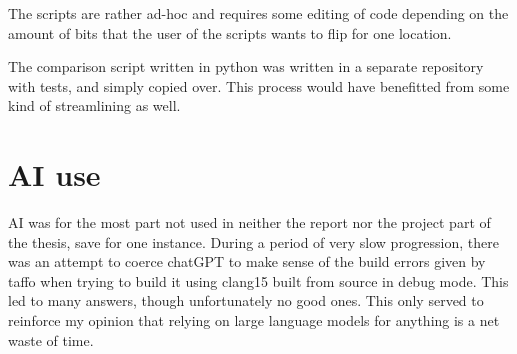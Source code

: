 The scripts are rather ad-hoc and requires some editing of code depending on the amount of bits that the user of the scripts wants to flip for one location.

The comparison script written in python was written in a separate repository with tests, and simply copied over. This process would have benefitted from some kind of streamlining as well. 

\section{AI use}
AI was for the most part not used in neither the report nor the project part of the thesis, save for one instance. During a period of very slow progression, there was an attempt to coerce chatGPT to make sense of the build errors given by taffo when trying to build it using clang15 built from source in debug mode. This led to many answers, though unfortunately no good ones. This only served to reinforce my opinion that relying on large language models for anything is a net waste of time. 
